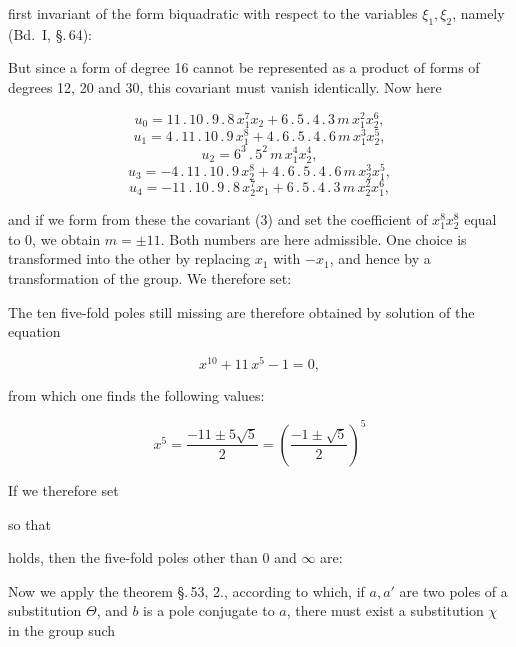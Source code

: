 first invariant of the form biquadratic with respect to the variables $\xi_1, \xi_2$, namely (Bd.\ I, \S.\,64):


But since a form of degree 16 cannot be represented as a product of forms of degrees 12, 20 and 30, this covariant must vanish identically. Now here

\[
u_0 = 11\,.\,10\,.\,9\,.\,8\,x_1^7x_2 + 6\,.\,5\,.\,4\,.\,3\,m\,x_1^2x_2^6,
\]
\[
u_1 = 4\,.\,11\,.\,10\,.\,9\,x_1^8 + 4\,.\,6\,.\,5\,.\,4\,.\,6\,m\,x_1^3x_2^5,
\]
\[
u_2 = 6^3\,.\,5^2\,m\,x_1^4x_2^4,
\]
\[
u_3 = -4\,.\,11\,.\,10\,.\,9\,x_2^8 + 4\,.\,6\,.\,5\,.\,4\,.\,6\,m\,x_2^3x_1^5,
\]
\[
u_4 = -11\,.\,10\,.\,9\,.\,8\,x_2^7x_1 + 6\,.\,5\,.\,4\,.\,3\,m\,x_2^2x_1^6,
\]

and if we form from these the covariant (3) and set the coefficient of $x_1^8x_2^8$ equal to 0, we obtain $m = \pm 11$. Both numbers are here admissible. One choice is transformed into the other by replacing $x_1$ with $-x_1$, and hence by a transformation of the group. We therefore set:


The ten five-fold poles still missing are therefore obtained by solution of the equation

\[
x^{10} + 11\,x^5 - 1 = 0,
\]

from which one finds the following values:

\[
x^5 = \frac{-11 \pm 5\sqrt5}{2} = \left(\frac{-1 \pm \sqrt5}{2}\right)^5
\]

If we therefore set


so that


holds, then the five-fold poles other than 0 and $\infty$ are:


Now we apply the theorem \S.\,53, 2., according to which, if $a, a'$ are two poles of a substitution $\Theta$, and $b$ is a pole conjugate to $a$, there must exist a substitution $\chi$ in the group such
